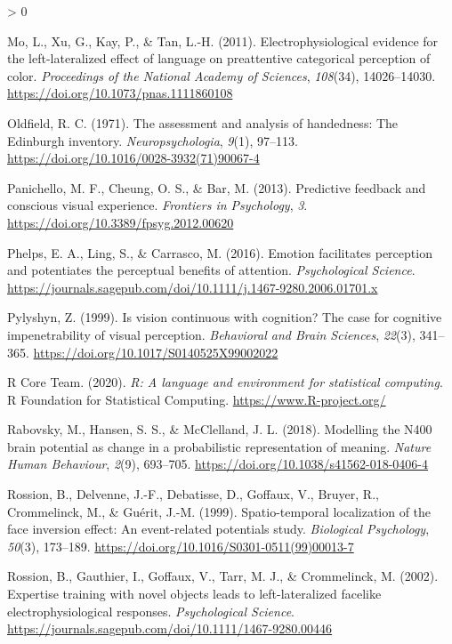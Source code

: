 \documentclass[
  english,
  man,12pt,twoside]{apa7}
\newlength{\cslhangindent}
\newenvironment{CSLReferences}[2] %
 {%
  \setlength{\parindent}{0pt}
  \ifodd #1 \everypar{\setlength{\hangindent}{\cslhangindent}}\ignorespaces\fi
  \ifnum #2 > 0
  \setlength{\parskip}{#2\baselineskip}
  \fi
 }%
 {}
\begin{document}
\begin{CSLReferences}{1}{0}
\leavevmode\hypertarget{ref-mo2011}{}%
Mo, L., Xu, G., Kay, P., \& Tan, L.-H. (2011). Electrophysiological evidence for the left-lateralized effect of language on preattentive categorical perception of color. \emph{Proceedings of the National Academy of Sciences}, \emph{108}(34), 14026--14030. \url{https://doi.org/10.1073/pnas.1111860108}

\leavevmode\hypertarget{ref-oldfield1971}{}%
Oldfield, R. C. (1971). The assessment and analysis of handedness: The {Edinburgh} inventory. \emph{Neuropsychologia}, \emph{9}(1), 97--113. \url{https://doi.org/10.1016/0028-3932(71)90067-4}

\leavevmode\hypertarget{ref-panichello2013}{}%
Panichello, M. F., Cheung, O. S., \& Bar, M. (2013). Predictive feedback and conscious visual experience. \emph{Frontiers in Psychology}, \emph{3}. \url{https://doi.org/10.3389/fpsyg.2012.00620}

\leavevmode\hypertarget{ref-phelps2016}{}%
Phelps, E. A., Ling, S., \& Carrasco, M. (2016). Emotion facilitates perception and potentiates the perceptual benefits of attention. \emph{Psychological Science}. \url{https://journals.sagepub.com/doi/10.1111/j.1467-9280.2006.01701.x}

\leavevmode\hypertarget{ref-pylyshyn1999}{}%
Pylyshyn, Z. (1999). Is vision continuous with cognition? The case for cognitive impenetrability of visual perception. \emph{Behavioral and Brain Sciences}, \emph{22}(3), 341--365. \url{https://doi.org/10.1017/S0140525X99002022}

\leavevmode\hypertarget{ref-R-base}{}%
R Core Team. (2020). \emph{R: A language and environment for statistical computing}. R Foundation for Statistical Computing. \url{https://www.R-project.org/}

\leavevmode\hypertarget{ref-rabovsky2018}{}%
Rabovsky, M., Hansen, S. S., \& McClelland, J. L. (2018). Modelling the {N400} brain potential as change in a probabilistic representation of meaning. \emph{Nature Human Behaviour}, \emph{2}(9), 693--705. \url{https://doi.org/10.1038/s41562-018-0406-4}

\leavevmode\hypertarget{ref-rossion1999}{}%
Rossion, B., Delvenne, J.-F., Debatisse, D., Goffaux, V., Bruyer, R., Crommelinck, M., \& Guérit, J.-M. (1999). Spatio-temporal localization of the face inversion effect: An event-related potentials study. \emph{Biological Psychology}, \emph{50}(3), 173--189. \url{https://doi.org/10.1016/S0301-0511(99)00013-7}

\leavevmode\hypertarget{ref-rossion2002}{}%
Rossion, B., Gauthier, I., Goffaux, V., Tarr, M. J., \& Crommelinck, M. (2002). Expertise training with novel objects leads to left-lateralized facelike electrophysiological responses. \emph{Psychological Science}. \url{https://journals.sagepub.com/doi/10.1111/1467-9280.00446}


\end{CSLReferences}
\end{document}
